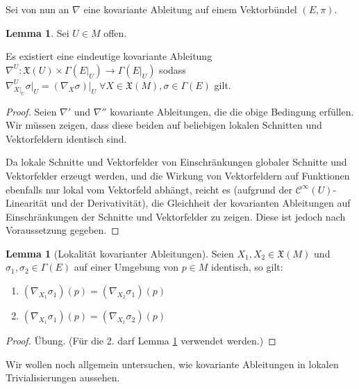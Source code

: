 \documentclass[a4paper]{scrreprt}
\numberwithin{equation}{chapter}
\newcommand{\sC}{\mathcal{C}^{\infty}}
\newcommand{\vf}{\mathfrak{X}}
\theoremstyle{definition}
\newtheorem{lemma}[defn]{Lemma}
\begin{document}
		Sei von nun an $\nabla$ eine kovariante Ableitung auf einem Vektorbündel $(E,\pi)$.
		\begin{lemma}\label{lemma:Einschränkung_kovarianter_Ableitungen}
			Sei $U\in M$ offen. 
			
			Es existiert eine eindeutige kovariante Ableitung $\nabla^U\colon\vf(U)\times\Gamma(E\vert_U)\rightarrow \Gamma(E\vert_U)$ sodass $\nabla^U_{X\vert_U}\sigma\vert_U=(\nabla_X\sigma)\vert_U\; \forall X\in\vf(M),\sigma\in\Gamma(E)$ gilt.
			\begin{proof}
				Seien $\nabla'$ und $\nabla''$ kovariante Ableitungen, die die obige Bedingung erfüllen. Wir müssen zeigen, dass diese beiden auf beliebigen lokalen Schnitten und Vektorfeldern identisch sind. 
				
				Da lokale Schnitte und Vektorfelder von Einschränkungen globaler Schnitte und Vektorfelder erzeugt werden, und die Wirkung von Vektorfeldern auf Funktionen ebenfalls nur lokal vom Vektorfeld abhängt, reicht es (aufgrund der $\sC(U)$-Linearität und der Derivativität), die Gleichheit der kovarianten Ableitungen auf Einschränkungen der Schnitte und Vektorfelder zu zeigen. Diese ist jedoch nach Voraussetzung gegeben.
			\end{proof}
		\end{lemma}
		\begin{lemma}[Lokalität kovarianter Ableitungen]
			Seien $X_1,X_2\in\vf(M)$ und $\sigma_1,\sigma_2\in\Gamma(E)$ auf einer Umgebung von $p\in M$ identisch, so gilt:
			\begin{enumerate}
				\item $\left(\nabla_{X_1}\sigma_1\right)(p)=\left(\nabla_{X_2}\sigma_1\right)(p)$
				\item $\left(\nabla_{X_1}\sigma_1\right)(p)=\left(\nabla_{X_1}\sigma_2\right)(p)$
			\end{enumerate}
			\begin{proof}
				Übung. (Für die 2. darf Lemma \ref{lemma:Einschränkung_kovarianter_Ableitungen} verwendet werden.)
			\end{proof}
		\end{lemma}
		Wir wollen noch allgemein untersuchen, wie kovariante Ableitungen in lokalen Trivialisierungen aussehen.
\end{document}

